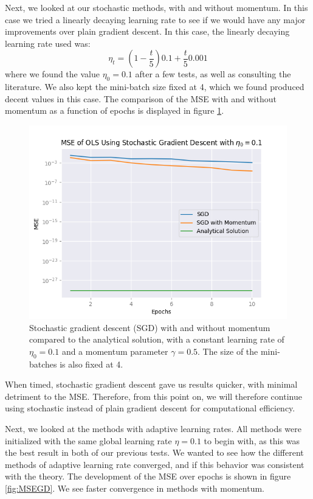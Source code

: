 Next, we looked at our stochastic methods, with and without momentum. In this case we tried a linearly decaying learning rate to see if we would have any major improvements over plain gradient descent. In this case, the linearly decaying learning rate used was:
\[
\eta_t = (1- \frac{t}{5})0.1 + \frac{t}{5} 0.001
\]
where we found the value $\eta_0 = 0.1$ after a few tests, as well as consulting the literature. We also kept the mini-batch size fixed at 4, which we found produced decent values in this case. The comparison of the MSE with and without momentum as a function of epochs is displayed in figure \ref{fig:sgdVSanalytical}. 
\begin{figure}
    \centering
    \includegraphics[width=\linewidth]{figures/all_plots/sgd_mse_pr_epoch_eta_1e-1.png}
    \caption{Stochastic gradient descent (SGD) with and without momentum compared to the analytical solution, with a constant learning rate of $\eta_0 = 0.1$ and a momentum parameter $\gamma = 0.5$. The size of the mini-batches is also fixed at 4.}
    \label{fig:sgdVSanalytical}
\end{figure}

When timed, stochastic gradient descent gave us results quicker, with minimal detriment to the MSE. Therefore, from this point on, we will therefore continue using stochastic instead of plain gradient descent for computational efficiency.

Next, we looked at the methods with adaptive learning rates. All methods were initialized with the same global learning rate $\eta = 0.1$ to begin with, as this was the best result in both of our previous tests. We wanted to see how the different methods of adaptive learning rate converged, and if this behavior was consistent with the theory. The development of the MSE over epochs is shown in figure \ref{fig:MSEGD}. We see faster convergence in methods with momentum.

